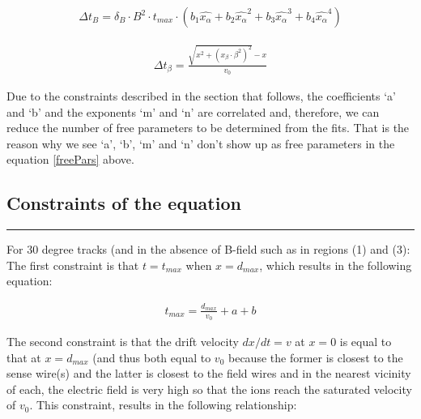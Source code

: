 \documentclass[12pt]{article}
\begin{document}
\begin{equation}
\label{Delta_t_B}
\begin{aligned}
  \Delta t_{B} = \delta_{B} \cdot B^2 \cdot t_{max} \cdot
            (b_1 \hat{x_{\alpha}} + b_2 \hat{x_{\alpha}}^2 + b_3 \hat{x_{\alpha}}^3 + b_4 \hat{x_{\alpha}}^4  )
\end{aligned}
\end{equation}

\begin{equation}
\label{Delta_t_beta}
\begin{aligned}
     \Delta t_{\beta} = \frac{ \sqrt{x^2 + (x_{\beta} \cdot \beta^2)^2} - x }{ v_0 }
\end{aligned}
\end{equation}

Due to the constraints described in the section that follows, the coefficients `a' and `b' and the exponents `m' and `n' are correlated and, therefore, we can reduce the number of free parameters to be determined from the fits. That is the reason why we see `a', `b', `m' and `n' don't show up as free parameters in the equation \ref{freePars} above.


\subsection{Constraints of the equation}
\label{constraintsTvsX}
{\color{black} \rule{\linewidth}{0.5mm} }

For 30 degree tracks (and in the absence of B-field such as in regions (1) and (3): \\
The first constraint is that $t = t_{max}$ when $x = d_{max}$, which results in the following equation:

\begin{equation}
\label{tvsxConstraints1}
\begin{aligned}     
     t_{max} = \frac{d_{max}}{v_0} + a + b
  \end{aligned}
\end{equation}

The second constraint is that the drift velocity $dx/dt = v$ at $x=0$ is equal to that at $x=d_{max}$ (and thus both equal to $v_0$ because the former is closest to the sense wire(s) and the latter is closest to the field wires and in the nearest vicinity of each, the electric field is very high so that the ions reach the saturated velocity of $v_0$. This constraint, results in the following relationship:
\end{document}
